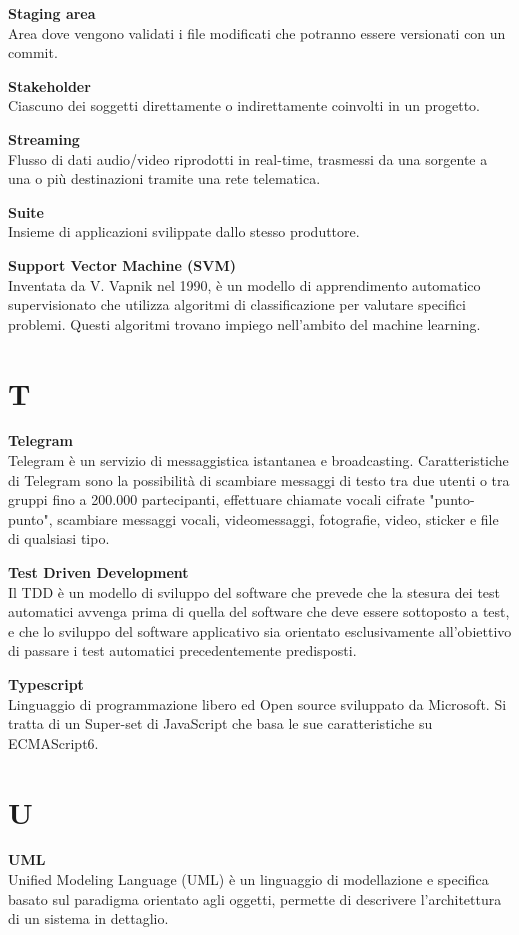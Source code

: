 \documentclass[a4paper, oneside, openany, dvipsnames, table, 12pt]{article}
\begin{document}
\textbf{Staging area} \\
Area dove vengono validati i file modificati che potranno essere versionati con un commit\glo.

\textbf{Stakeholder} \\
Ciascuno dei soggetti direttamente o indirettamente coinvolti in un progetto.

\textbf{Streaming} \\
Flusso di dati audio/video riprodotti in real-time, trasmessi da una sorgente a una o più destinazioni tramite una rete telematica.

\textbf{Suite} \\
Insieme di applicazioni svilippate dallo stesso produttore.

\textbf{Support Vector Machine (SVM)} \\
Inventata da V. Vapnik nel 1990, è un modello di apprendimento automatico supervisionato che utilizza algoritmi di classificazione per valutare specifici problemi. Questi algoritmi trovano impiego nell'ambito del machine learning.

\newpage
\section{T}
\textbf{Telegram} \\
Telegram è un servizio di messaggistica istantanea e broadcasting. Caratteristiche di Telegram sono la possibilità di scambiare messaggi di testo tra due utenti o tra gruppi fino a 200.000 partecipanti, effettuare chiamate vocali cifrate "punto-punto", scambiare messaggi vocali, videomessaggi, fotografie, video, sticker e file di qualsiasi tipo.

\label{par:tdd}
\textbf{Test Driven Development} \\
Il TDD è un modello di sviluppo del software che prevede che la stesura dei test automatici avvenga prima di quella del software che deve essere sottoposto a test, e che lo sviluppo del software applicativo sia orientato esclusivamente all'obiettivo di passare i test automatici precedentemente predisposti.

\textbf{Typescript} \\
Linguaggio di programmazione libero ed Open source sviluppato da Microsoft. Si tratta di un Super-set di JavaScript che basa le sue caratteristiche su ECMAScript6.

\newpage
\section{U}
\textbf{UML} \\
Unified Modeling Language (UML) è un linguaggio di modellazione e specifica basato sul paradigma orientato agli oggetti, permette di descrivere l’architettura di un sistema in dettaglio. 
\end{document}

